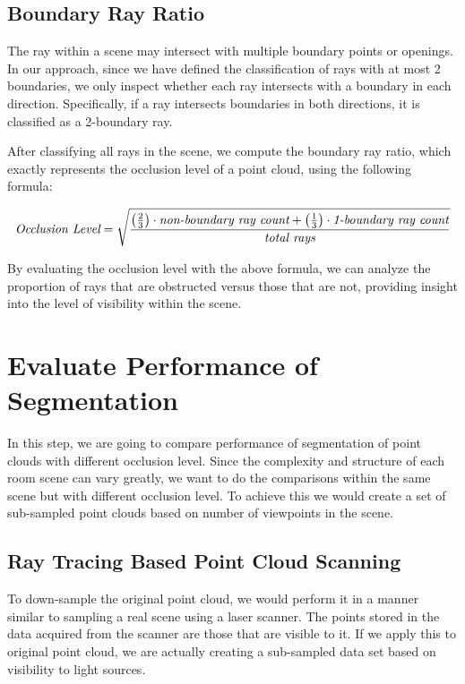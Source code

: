 \documentclass[11pt, a4paper,oneside,chapterprefix=false]{scrbook}
\begin{document}
\subsection{Boundary Ray Ratio}

The ray within a scene may intersect with multiple boundary points or openings. In our approach, since we have defined the classification of rays with at most 2 boundaries, we only inspect whether each ray intersects with a boundary in each direction. Specifically, if a ray intersects boundaries in both directions, it is classified as a 2-boundary ray.

\vspace{10pt}

After classifying all rays in the scene, we compute the boundary ray ratio, which exactly represents the occlusion level of a point cloud, using the following formula:

\[
\emph{{Occlusion Level}} = \sqrt{\frac{{\left(\frac{2}{3}\right) \cdot \emph{{non-boundary ray count}} + \left(\frac{1}{3}\right) \cdot \emph{{1-boundary ray count}}}}{{\emph{{total rays}}}}}
\]

\vspace{5pt}

By evaluating the occlusion level with the above formula, we can analyze the proportion of rays that are obstructed versus those that are not, providing insight into the level of visibility within the scene.


\section{Evaluate Performance of Segmentation} \label{evaluate performance of segmentation}

In this step, we are going to compare performance of segmentation of point clouds with different occlusion level. Since the complexity and structure of each room scene can vary greatly, we want to do the comparisons within the same scene but with different occlusion level. To achieve this we would create a set of sub-sampled point clouds based on number of viewpoints in the scene.

\subsection{Ray Tracing Based Point Cloud Scanning} \label{sec:ray tracing point cloud scanning}

To down-sample the original point cloud, we would perform it in a manner similar to sampling a real scene using a laser scanner. The points stored in the data acquired from the scanner are those that are visible to it. If we apply this to original point cloud, we are actually creating a sub-sampled data set based on visibility to light sources. 
\end{document}
